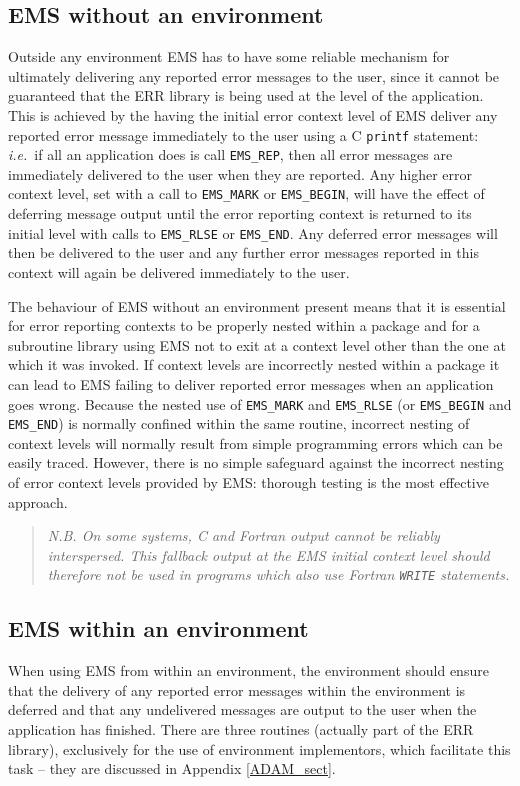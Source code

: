 \documentclass[twoside,11pt]{starlink}
\begin{document}
\subsection{EMS without an environment}
Outside any environment EMS has to have some reliable mechanism for ultimately
delivering any reported error messages to the user, since it cannot be
guaranteed that the ERR library is being used at the level of the application.
This is achieved by the having the initial error context level of EMS deliver
any reported error message immediately to the user using a C \texttt{printf}
statement: \textit{i.e.}\ if all an application does is call \texttt{EMS\_REP},
then all error messages are immediately delivered to the user when they are
reported.
Any higher error context level, set with a call to \texttt{EMS\_MARK} or
\texttt{EMS\_BEGIN},
will have the effect of deferring message output until the error reporting
context is returned to its initial level with calls to \texttt{EMS\_RLSE}
or \texttt{EMS\_END}.
Any deferred error messages will then be delivered to the user and any further
error messages reported in this context will again be delivered immediately to
the user.

The behaviour of EMS without an environment present means that it is essential
for error reporting contexts to be properly nested within a package and for a
subroutine library using EMS not to exit at a context level other than the
one at which it was invoked.
If context levels are incorrectly nested within a package it can lead to
EMS failing to deliver reported error messages when an application goes wrong.
Because the nested use of \texttt{EMS\_MARK} and \texttt{EMS\_RLSE}
(or \texttt{EMS\_BEGIN} and
\texttt{EMS\_END}) is normally confined within the same routine, incorrect
nesting of context levels will normally result from simple programming errors
which can be easily traced.
However, there is no simple safeguard against the incorrect nesting of error
context levels provided by EMS: thorough testing is the most effective
approach.
\begin{quote}
\emph{N.B. On some systems, C and Fortran output cannot be reliably
interspersed. This fallback output at the  EMS initial context level should
therefore not be used in programs which also use Fortran \texttt{WRITE}
statements.}
\end{quote}

\subsection{EMS within an environment}
When using EMS from within an environment, the environment should ensure that
the delivery of any reported error messages within the environment is deferred
and that any undelivered messages are output to the user when the application
has finished.
There are three routines (actually part of the ERR library), exclusively for
the use of environment implementors, which facilitate this task -- they are
discussed in Appendix \ref{ADAM_sect}.
\end{document}
